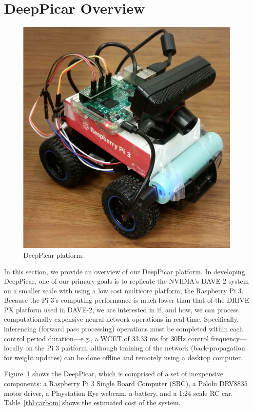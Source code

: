 \section{DeepPicar Overview}

\begin{figure}[t]
  \centering
  \includegraphics[width=.55\textwidth]{figs/DeepPicar_platform}
  \caption{DeepPicar platform.}
  \label{fig:overview}
\end{figure}

In this section, we provide an overview of our DeepPicar platform. In
developing DeepPicar, one of our primary goals is to replicate the
NVIDIA's DAVE-2 system on a smaller scale with using a low cost
multicore platform, the Raspberry Pi 3. Because the Pi 3's computing
performance is much lower than that of the DRIVE PX platform used in
DAVE-2, we are interested in if, and how, we can process
computationally expensive neural network operations in
real-time. Specifically, inferencing (forward pass processing)
operations must be completed within each control period
duration---e.g., a WCET of 33.$\overline{\mbox{33}}$ ms for 30Hz control 
frequency---locally on the Pi 3 platform, although training of the 
network (back-propagation for weight updates) can be done offline and 
remotely using a desktop computer.

Figure~\ref{fig:overview} shows the DeepPicar, which is comprised of a
set of inexpensive components: a Raspberry Pi 3 Single Board Computer
(SBC), a Pololu DRV8835 motor driver, a Playstation Eye webcam, a
battery, and a 1:24 scale RC car. Table~\ref{tbl:carbom} shows the
estimated cost of the system.

